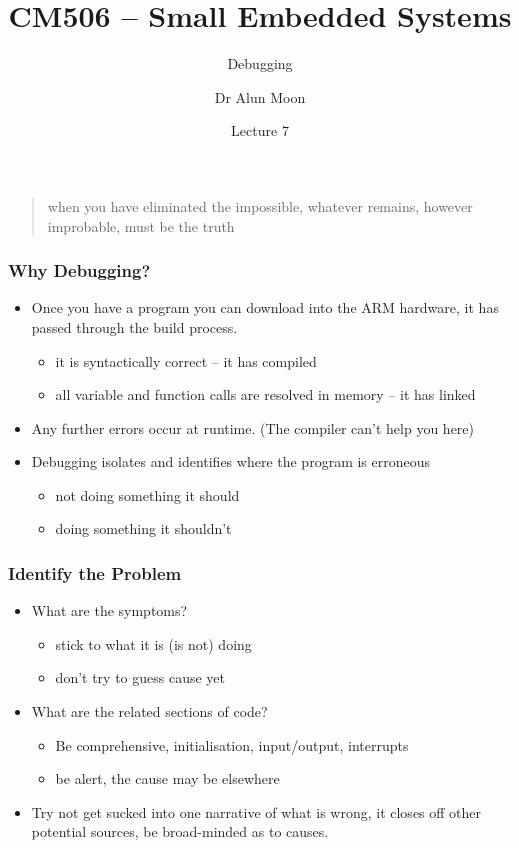 \documentclass{beamer}
\title{CM506 -- Small Embedded Systems}
\subtitle{Debugging}
\author{Dr Alun Moon}
\institute[CS]{Department of Computer and Information Science }
\date{Lecture 7}
\begin{document}
\frame\maketitle

\begin{frame}
  \begin{quote}
    when you have eliminated the impossible, whatever remains, however improbable, must be the truth
\\

  \end{quote}
\end{frame}

\begin{frame}
  \frametitle{Why Debugging?}
  \begin{itemize}
  \item Once you have a program you can download into the ARM hardware, it has passed through the build process.
    \begin{itemize}
    \item it is syntactically correct -- it has compiled
    \item all variable and function calls are resolved in memory -- it has linked
    \end{itemize}
  \item Any further errors occur at runtime.  (The compiler can't help you here)
  \item Debugging isolates and identifies where the program is erroneous
    \begin{itemize}
    \item not doing something it should
    \item doing something it shouldn't
    \end{itemize}

  \end{itemize}
\end{frame}

\begin{frame}
  \frametitle{Identify the Problem}
  \begin{itemize}
  \item What are the symptoms?
    \begin{itemize}
    \item stick to what it is (is not) doing
    \item don't try to guess cause yet
    \end{itemize}
  \item What are the related sections of code?
    \begin{itemize}
    \item Be comprehensive,  initialisation, input/output, interrupts
    \item be alert,  the cause may be elsewhere
    \end{itemize}
    \item Try not get sucked into one narrative of what is wrong, it
      closes off other potential sources,  be broad-minded as to
      causes.
  \end{itemize}
\end{frame}
\end{document}
